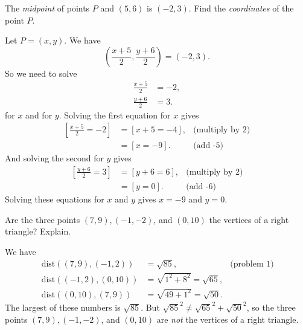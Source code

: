 \documentclass[12pt,fleqn,answers]{exam}
\newcommand{\dist}{\, \mathrm{dist}}
\begin{document}
\begin{questions}
\begin{solution}[2.0in]
\end{solution}

\question[5] The \emph{midpoint} of points $P$ and $(5,6)$ is $(-2,3)$. Find the 
\emph{coordinates} of the point $P$.
\begin{solution}[2.0in] Let $P = (x,y)$. We have
    \begin{equation*}
        \left(\frac{x+5}{2}, \frac{y+6}{2} \right) = (-2,3).
    \end{equation*}
    So we need to solve
    \begin{align*}
        \frac{x+5}{2} &= -2,\\
        \frac{y+6}{2} &= 3.
    \end{align*}
    for $x$ and for $y$. Solving the first equation for $x$ gives
    \begin{align*}
        \left[  \frac{x+5}{2} = -2 \right] &= [x + 5 = -4], &\mbox{(multiply by 2)}\\
                                            &= [x=-9]. &\mbox{(add -5)}
    \end{align*}
    And solving the second for $y$ gives
    \begin{align*}
        \left[  \frac{y+6}{2} = 3 \right] &= [y+6 = 6], &\mbox{(multiply by 2)}\\
                                           &= [y=0]. &\mbox{(add -6)}
    \end{align*}
    Solving these equations for $x$ and $y$ gives $x=-9$ and $y=0$.

\end{solution}


\question[5] Are the three points  $(7,9), (-1,-2)$, and  $(0,10)$ the vertices of
a right triangle? Explain.

\begin{solution}
We have
\begin{align*}
    \dist((7,9), (-1,2)) &= \sqrt{85}, &\mbox{(problem 1)}\\
    \dist((-1,2), (0,10)) &= \sqrt{1^2 + 8^2} = \sqrt{65}, \\
    \dist((0,10),(7,9)) &= \sqrt{49 + 1^2} = \sqrt{50}.
\end{align*}
The largest of these numbers is $\sqrt{85}$. But $\sqrt{85}^2 \neq \sqrt{65}^2 + \sqrt{50}^2$,
so the three points $(7,9), (-1,-2)$, and  $(0,10)$ are \emph{not} the vertices of a
right triangle.

\end{solution}

\end{questions}
\end{document}

